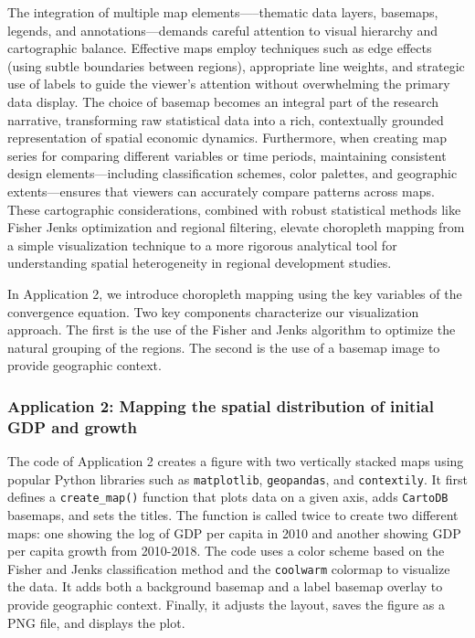 \documentclass[smallextended, natbib]{svjour3}       %
\begin{document}
The integration of multiple map elements—--thematic data layers, basemaps, legends, and annotations---demands careful attention to visual hierarchy and cartographic balance.
Effective maps employ techniques such as edge effects (using subtle boundaries between regions), appropriate line weights, and strategic use of labels to guide the viewer's attention without overwhelming the primary data display.
The choice of basemap becomes an integral part of the research narrative, transforming raw statistical data into a rich, contextually grounded representation of spatial economic dynamics.
Furthermore, when creating map series for comparing different variables or time periods, maintaining consistent design elements—including classification schemes, color palettes, and geographic extents—ensures that viewers can accurately compare patterns across maps.
These cartographic considerations, combined with robust statistical methods like Fisher Jenks optimization and regional filtering, elevate choropleth mapping from a simple visualization technique to a more rigorous analytical tool for understanding spatial heterogeneity in regional development studies.


In Application 2, we introduce choropleth mapping using the key variables of the convergence equation.
Two key components characterize our visualization approach.
The first is the use of the Fisher and Jenks algorithm to optimize the natural grouping of the regions.
The second is the use of a basemap image to provide geographic context.

\subsubsection*{Application 2: Mapping the spatial distribution of initial GDP and growth}

The code of Application 2 creates a figure with two vertically stacked maps using popular Python libraries such as  \verb|matplotlib|, \verb|geopandas|, and \verb|contextily|. 
It first defines a \verb|create_map()| function that plots data on a given axis, adds \verb|CartoDB| basemaps, and sets the titles. 
The function is called twice to create two different maps: one showing the log of GDP per capita in 2010 and another showing GDP per capita growth from 2010-2018. 
The code uses a color scheme based on the Fisher and Jenks classification method and the \verb|coolwarm| colormap to visualize the data. 
It adds both a background basemap and a label basemap overlay to provide geographic context. 
Finally, it adjusts the layout, saves the figure as a PNG file, and displays the plot. 
\end{document}
